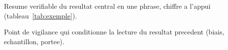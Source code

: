 \documentclass[11pt,a4paper]{article}
\begin{document}
%
%
%
%
%
%

\begin{resultat}
Resume verifiable du resultat central en une phrase, chiffre a l'appui (tableau~\ref{tab:exemple}).
\end{resultat}

\begin{avertissement}
Point de vigilance qui conditionne la lecture du resultat precedent (biais, echantillon, portee).
\end{avertissement}
\end{document}
